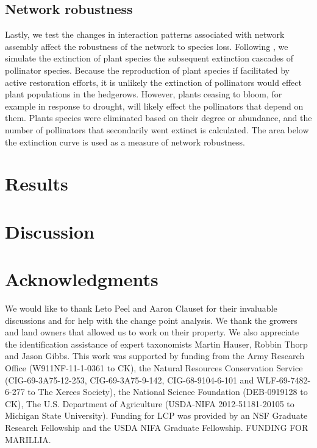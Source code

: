 \documentclass[12pt]{article}
\begin{document}
\subsection*{Network robustness}
Lastly, we test the changes in interaction patterns associated with
network assembly affect the robustness of the network to species
loss. Following \cite{Memmott2004}, we simulate the extinction of
plant species the subsequent extinction cascades of pollinator
species. Because the reproduction of plant species if facilitated by
active restoration efforts, it is unlikely the extinction of
pollinators would effect plant populations in the hedgerows. However,
plants ceasing to bloom, for example in response to drought, will
likely effect the pollinators that depend on them. Plants species were
eliminated based on their degree or abundance, and the number of
pollinators that secondarily went extinct is calculated. The area
below the extinction curve is used as a measure of network robustness.


\section*{Results}
\label{sec:results}

\section*{Discussion}
\label{sec:discussion}

\section*{Acknowledgments}
\label{sec:acknowledge}

We would like to thank Leto Peel and Aaron Clauset for their
invaluable discussions and for help with the change point analysis.
We thank the growers and land owners that allowed us to work on their
property.  We also appreciate the identification assistance of expert
taxonomists Martin Hauser, Robbin Thorp and Jason Gibbs.  This work
was supported by funding from the Army Research Office
(W911NF-11-1-0361 to CK), the Natural Resources Conservation Service
(CIG-69-3A75-12-253, CIG-69-3A75-9-142, CIG-68-9104-6-101 and
WLF-69-7482-6-277 to The Xerces Society), the National Science
Foundation (DEB-0919128 to CK), The U.S.  Department of Agriculture
(USDA-NIFA 2012-51181-20105 to Michigan State University).  Funding
for LCP was provided by an NSF Graduate Research Fellowship and the
USDA NIFA Graduate Fellowship. FUNDING FOR MARILLIA.




\end{document}
